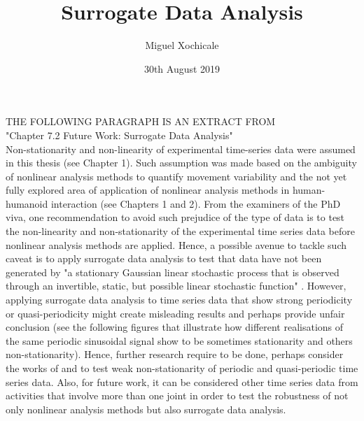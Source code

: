 \documentclass[11pt]{article}
\author{Miguel Xochicale\\
}
\title{Surrogate Data Analysis}
\date{30th August 2019}
\begin{document}
\maketitle


THE FOLLOWING PARAGRAPH IS AN EXTRACT FROM \\
"Chapter 7.2 Future Work: Surrogate Data Analysis" \\


Non-stationarity and non-linearity of experimental time-series data 
were assumed in this thesis (see Chapter 1).
Such assumption was made based on the ambiguity of 
nonlinear analysis methods to quantify movement variability
and the not yet fully explored area of application of nonlinear analysis 
methods in human-humanoid interaction (see Chapters 1 and 2). 
From the examiners of the PhD viva, 
one recommendation to avoid such prejudice of the type of data  
is to test the non-linearity and non-stationarity  
of the experimental time series data before nonlinear analysis 
methods are applied.
Hence, a possible avenue to tackle such caveat 
is to apply surrogate data analysis to test that 
data have not been generated by "a stationary Gaussian linear
stochastic process that is observed through an invertible,
static, but possible linear stochastic function" 
\citep[p. 2]{schreiber2000}.
However, applying surrogate data analysis to time series data 
that show strong periodicity or quasi-periodicity 
might create misleading results and perhaps provide unfair 
conclusion 
(see the following figures that illustrate how different 
realisations of the same periodic sinusoidal signal 
show to be sometimes stationarity and others non-stationarity).
Hence, further research require to be done,
perhaps consider the works of 
\cite{stam1998} and  \cite{small2002}
to test weak non-stationarity 
of periodic and quasi-periodic time series data.
Also, for future work, 
it can be considered other time series data from 
activities that involve more than one joint 
in order to test the robustness of 
not only nonlinear analysis methods but 
also surrogate data analysis.
\end{document}
